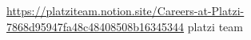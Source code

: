 \documentclass{article}
\begin{document}
    \url{https://platziteam.notion.site/Careers-at-Platzi-7868d95947fa48c48408508b16345344}
    platzi team
\end{document}
